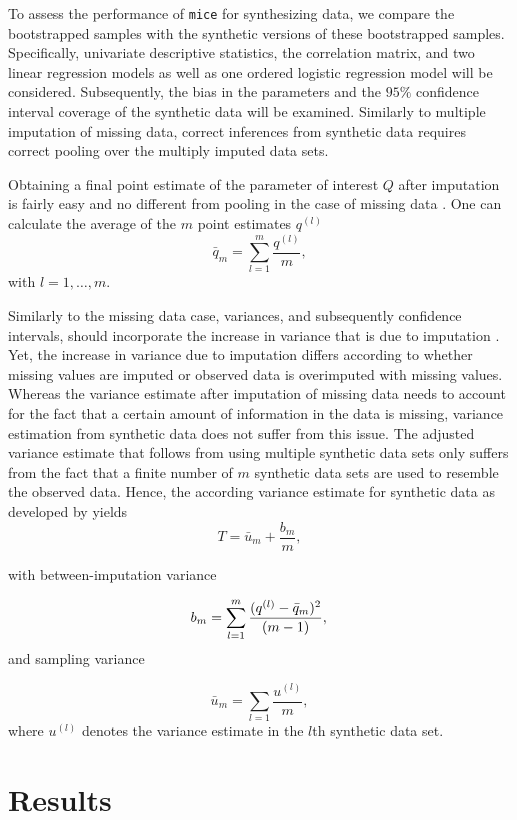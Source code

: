 \documentclass[psych,article,submit,moreauthors,pdftex]{mdpi}
\begin{document}
To assess the performance of \texttt{mice} for synthesizing data, we
compare the bootstrapped samples with the synthetic versions of these
bootstrapped samples. Specifically, univariate descriptive statistics,
the correlation matrix, and two linear regression models as well as one
ordered logistic regression model will be considered. Subsequently, the
bias in the parameters and the \(95\%\) confidence interval coverage of
the synthetic data will be examined. Similarly to multiple imputation of
missing data, correct inferences from synthetic data requires correct
pooling over the multiply imputed data sets.

Obtaining a final point estimate of the parameter of interest \(Q\)
after imputation is fairly easy and no different from pooling in the
case of missing data \citep{rubin_multiple_1987}. One can calculate the
average of the \(m\) point estimates \(q^{(l)}\) \[
\bar{q}_m = \sum_{l = 1}^m \frac{q^{(l)}}{m},
\] with \(l = 1, \dots, m\).

Similarly to the missing data case, variances, and subsequently
confidence intervals, should incorporate the increase in variance that
is due to imputation
\citep{reiter_partially_inference_2003, drechsler_synthetic_2011}. Yet,
the increase in variance due to imputation differs according to whether
missing values are imputed or observed data is overimputed with missing
values. Whereas the variance estimate after imputation of missing data
needs to account for the fact that a certain amount of information in
the data is missing, variance estimation from synthetic data does not
suffer from this issue. The adjusted variance estimate that follows from
using multiple synthetic data sets only suffers from the fact that a
finite number of \(m\) synthetic data sets are used to resemble the
observed data. Hence, the according variance estimate for synthetic data
as developed by \citet{reiter_partially_inference_2003} yields \[
T = \bar{u}_m + \frac{b_m}{m},
\]

with between-imputation variance

\[
b_m = \sum_{l = 1}^m \frac{(q^{(l)} - \bar{q}_m)^2}{(m - 1)}, \\
\] and sampling variance

\[
\bar{u}_m = \sum_{l = 1} \frac{u^{(l)}}{m},
\] where \(u^{(l)}\) denotes the variance estimate in the \(l\)th
synthetic data set.

\hypertarget{results}{%
\section{Results}\label{results}}
\end{document}

